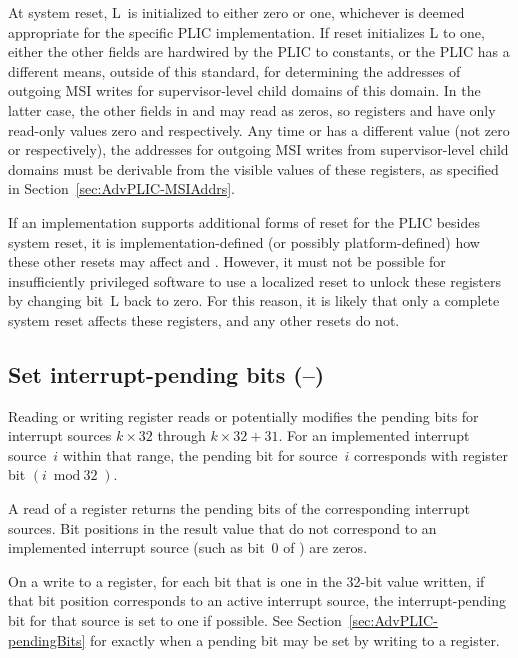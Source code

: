 At system reset, L~is initialized to either zero or one, whichever is
deemed appropriate for the specific PLIC implementation.
If reset initializes L to one, either the other fields are
hardwired by the PLIC to constants, or the PLIC has a different means,
outside of this standard, for determining the addresses of outgoing MSI
writes for supervisor-level child domains of this domain.
In the latter case, the other fields in  and
 may read as zeros, so registers  and
 have only read-only values zero and 
respectively.
Any time  or  has a different value
(not zero or  respectively), the addresses for outgoing
MSI writes from supervisor-level child domains must be derivable
from the visible values of these registers, as specified in
Section~\ref{sec:AdvPLIC-MSIAddrs}.

If an implementation supports additional forms of reset for the
PLIC besides system reset, it is implementation-defined (or possibly
platform-defined) how these other resets may affect  and
.
However, it must not be possible for insufficiently privileged software
to use a localized reset to unlock these registers by changing bit~L
back to zero.
For this reason, it is likely that only a complete system reset affects
these registers, and any other resets do not.

\subsection{%
Set interrupt-pending bits (--)%
}

Reading or writing register  reads or potentially
modifies the pending bits for interrupt sources $k\times\mbox{32}$
through ${k\times\mbox{32}+\mbox{31}}$.
For an implemented interrupt source~$i$ within that range, the pending
bit for source~$i$ corresponds with register bit ${(i\bmod\mbox{32})}$.

A read of a  register returns the pending bits of the
corresponding interrupt sources.
Bit positions in the result value that do not correspond to an
implemented interrupt source (such as bit~0 of ) are
zeros.

On a write to a  register, for each bit that is one in the
\mbox{32-bit} value written, if that bit position corresponds to an
active interrupt source, the interrupt-pending bit for that source is
set to one if possible.
See Section~\ref{sec:AdvPLIC-pendingBits} for exactly when a pending
bit may be set by writing to a  register.

